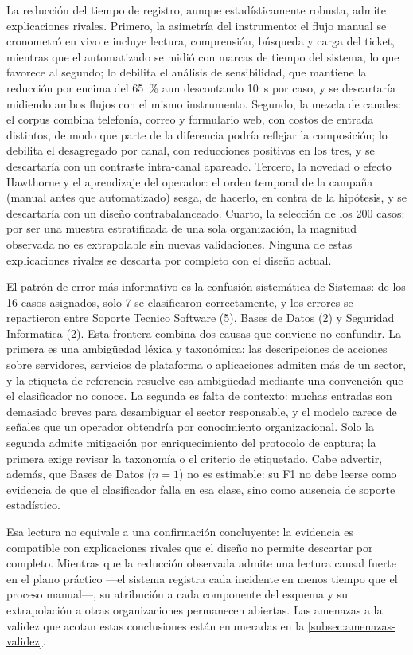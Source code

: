 La reducción del tiempo de registro, aunque estadísticamente robusta, admite explicaciones rivales. Primero, la asimetría del instrumento: el flujo manual se cronometró en vivo e incluye lectura, comprensión, búsqueda y carga del ticket, mientras que el automatizado se midió con marcas de tiempo del sistema, lo que favorece al segundo; lo debilita el análisis de sensibilidad, que mantiene la reducción por encima del 65~\% aun descontando 10~s por caso, y se descartaría midiendo ambos flujos con el mismo instrumento. Segundo, la mezcla de canales: el corpus combina telefonía, correo y formulario web, con costos de entrada distintos, de modo que parte de la diferencia podría reflejar la composición; lo debilita el desagregado por canal, con reducciones positivas en los tres, y se descartaría con un contraste intra-canal apareado. Tercero, la novedad o efecto Hawthorne y el aprendizaje del operador: el orden temporal de la campaña (manual antes que automatizado) sesga, de hacerlo, en contra de la hipótesis, y se descartaría con un diseño contrabalanceado. Cuarto, la selección de los 200 casos: por ser una muestra estratificada de una sola organización, la magnitud observada no es extrapolable sin nuevas validaciones. Ninguna de estas explicaciones rivales se descarta por completo con el diseño actual.

El patrón de error más informativo es la confusión sistemática de Sistemas: de los 16 casos asignados, solo 7 se clasificaron correctamente, y los errores se repartieron entre Soporte Tecnico Software (5), Bases de Datos (2) y Seguridad Informatica (2). Esta frontera combina dos causas que conviene no confundir. La primera es una ambigüedad léxica y taxonómica: las descripciones de acciones sobre servidores, servicios de plataforma o aplicaciones admiten más de un sector, y la etiqueta de referencia resuelve esa ambigüedad mediante una convención que el clasificador no conoce. La segunda es falta de contexto: muchas entradas son demasiado breves para desambiguar el sector responsable, y el modelo carece de señales que un operador obtendría por conocimiento organizacional. Solo la segunda admite mitigación por enriquecimiento del protocolo de captura; la primera exige revisar la taxonomía o el criterio de etiquetado. Cabe advertir, además, que Bases de Datos (\(n = 1\)) no es estimable: su F1 no debe leerse como evidencia de que el clasificador falla en esa clase, sino como ausencia de soporte estadístico.

Esa lectura no equivale a una confirmación concluyente: la evidencia es compatible con explicaciones rivales que el diseño no permite descartar por completo. Mientras que la reducción observada admite una lectura causal fuerte en el plano práctico ---el sistema registra cada incidente en menos tiempo que el proceso manual---, su atribución a cada componente del esquema y su extrapolación a otras organizaciones permanecen abiertas. Las amenazas a la validez que acotan estas conclusiones están enumeradas en la \autoref{subsec:amenazas-validez}.

